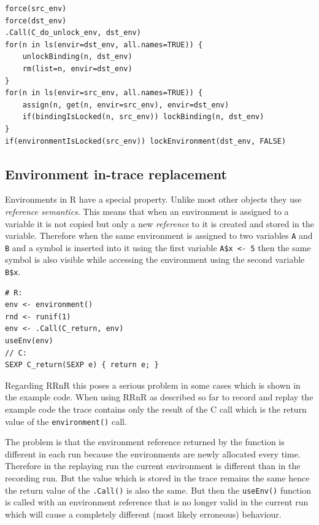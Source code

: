 \documentclass[thesis=M,english,hidelinks]{FITthesis}[2012/10/20]
\begin{document}
\begin{lstlisting}[style=filestyle, caption={The \lstinline|replace_environment()| function}]
force(src_env)
force(dst_env)
.Call(C_do_unlock_env, dst_env)
for(n in ls(envir=dst_env, all.names=TRUE)) {
	unlockBinding(n, dst_env)
	rm(list=n, envir=dst_env)
}
for(n in ls(envir=src_env, all.names=TRUE)) {
	assign(n, get(n, envir=src_env), envir=dst_env)
	if(bindingIsLocked(n, src_env)) lockBinding(n, dst_env)
}
if(environmentIsLocked(src_env)) lockEnvironment(dst_env, FALSE)
\end{lstlisting}
		
		\subsection{Environment in-trace replacement}
		Environments in R have a special property. Unlike most other objects they use \emph{reference semantics}. This means that when an environment is assigned to a variable it is not copied but only a new \emph{reference} to it is created and stored in the variable. Therefore when the same environment is assigned to two variables \lstinline|A| and \lstinline|B| and a symbol is inserted into it using the first variable \lstinline|A$x <- 5| then the same symbol is also visible while accessing the environment using the second variable \lstinline|B$x|.\par
		
\begin{lstlisting}[style=filestyle, caption={Example code where reference semantics cause the problem}]
# R:
env <- environment()
rnd <- runif(1)
env <- .Call(C_return, env)
useEnv(env)
// C:
SEXP C_return(SEXP e) { return e; }
\end{lstlisting}

		Regarding RRnR this poses a serious problem in some cases which is shown in the example code. When using RRnR as described so far to record and replay the example code the trace contains only the result of the C call which is the return value of the \lstinline|environment()| call.\par
		
		The problem is that the environment reference returned by the function is different in each run because the environments are newly allocated every time. Therefore in the replaying run the current environment is different than in the recording run. But the value which is stored in the trace remains the same hence the return value of the \lstinline|.Call()| is also the same. But then the \lstinline|useEnv()| function is called with an environment reference that is no longer valid in the current run which will cause a completely different (most likely erroneous) behaviour.\par
		
\end{document}
